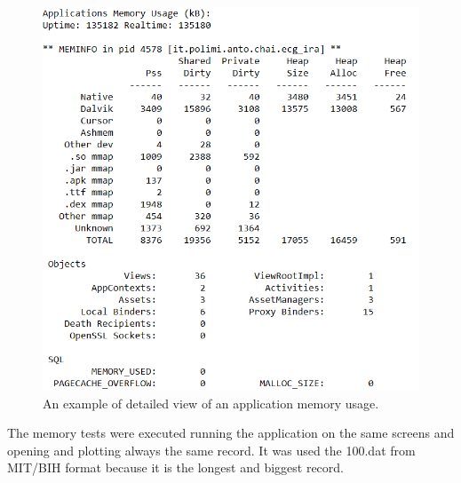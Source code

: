 \begin{figure}[h!]
	\centering
	\includegraphics[width=0.6\linewidth]{figures/ch10/12.png}
	\caption{An example of detailed view of an application memory usage.}  
	\label{fig10.12}
\end{figure}
The memory tests were executed running the application on the same screens and opening and plotting always the same record. It was used the 100.dat from MIT/BIH format because it is the longest and biggest record.
